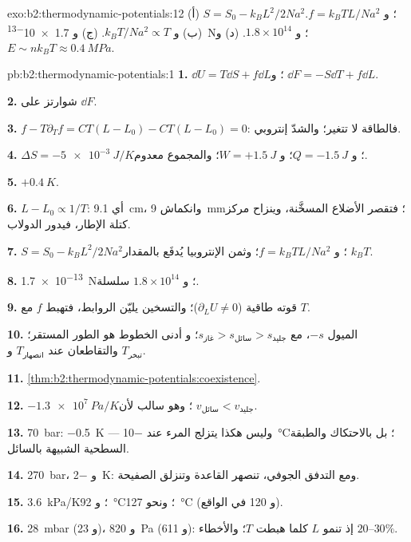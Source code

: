 \begin{solution}{exo:b2:thermodynamic-potentials:12}
(أ) $S = S_0 - k_BL^2/2Na^2$؛ و $f = k_BTL/Na^2$. (ب) و $k_BT/Na^2 \propto T$. (ج)
و \qty{1.7e-13}{N}؛ و $1.8 \times 10^{14}$. (د) و $E \sim nk_BT \approx \qty{0.4}{MPa}$.
\end{solution}

\begin{solution}{pb:b2:thermodynamic-potentials:1}
\textbf{1.} $\dd U = T\dd S + f\dd L$؛ و $\dd F = -S\dd T + f\dd L$.

\textbf{2.} شوارتز على $\dd F$.

\textbf{3.} $f - T\partial_Tf = CT(L - L_0) - CT(L - L_0) = 0$: فالطاقة
لا تتغير؛ والشدّ إنتروبي.

\textbf{4.} $\Delta S = \qty{-5e-3}{J/K}$؛ و $Q = \qty{-1.5}{J}$؛ و $W = +\qty{1.5}{J}$؛ والمجموع
معدوم.

\textbf{5.} $+\qty{0.4}{K}$.

\textbf{6.} $L - L_0 \propto 1/T$: أي \qty{9.1}{cm}، وانكماش \qty{9}{mm}؛ فتقصر
الأضلاع المسخَّنة، وينزاح مركز كتلة الإطار، فيدور
الدولاب.

\textbf{7.} $S = S_0 - k_BL^2/2Na^2$؛ و $f = k_BTL/Na^2$؛ وثمن الإنتروبيا
يُدفَع بالمقدار $k_BT$.

\textbf{8.} \qty{1.7e-13}{N}؛ و $1.8 \times 10^{14}$ سلسلة.

\textbf{9.} قوته طاقية ($\partial_LU \ne 0$)؛ والتسخين يليّن
الروابط، فتهبط $f$ مع $T$.

\textbf{10.} الميول $-s$، مع $s_{\text{غاز}} > s_{\text{سائل}} > s_{\text{جليد}}$؛ و
أدنى الخطوط هو الطور المستقر؛ والتقاطعان عند $T_{\text{انصهار}}$ و $T_{\text{تبخر}}$.

\textbf{11.} \cref{thm:b2:thermodynamic-potentials:coexistence}.

\textbf{12.} $\qty{-1.3e7}{Pa/K}$؛ وهو سالب لأن $v_{\text{سائل}} < v_{\text{جليد}}$.

\textbf{13.} \qty{70}{bar}: \qty{-0.5}{K} --- وليس هكذا يتزلج المرء عند
\qty{-10}{\celsius}؛ بل بالاحتكاك والطبقة السطحية الشبيهة بالسائل.

\textbf{14.} \qty{270}{bar}، و \qty{-2}{K}: ومع التدفق الجوفي، تنصهر
القاعدة وتنزلق الصفيحة.

\textbf{15.} \qty{3.6}{kPa/K}؛ و \qty{92}{\celsius}؛ ونحو \qty{127}{\celsius}
(و \qty{120}{} في الواقع).

\textbf{16.} \qty{28}{mbar} (و \qty{23}{})، و \qty{820}{Pa} (و \qty{611}{}): إذ تنمو $L$ كلما هبطت $T$؛
والأخطاء $20$--$30\%$.


\end{solution}
